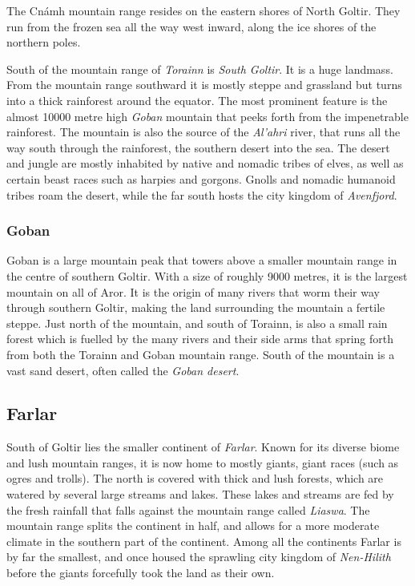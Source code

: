 The Cnámh mountain range resides on the eastern shores of North Goltir. They
run from the frozen sea all the way west inward, along the ice shores of the
northern poles.

South of the mountain range of \emph{Torainn} is \emph{South Goltir}. It is
a huge landmass. From the mountain range southward it is mostly steppe and
grassland but turns into a thick rainforest around the equator. The most
prominent feature is the almost 10000 metre high \emph{Goban} mountain that
peeks forth from the impenetrable rainforest. The mountain is also the source
of the \emph{Al'ahri} river, that runs all the way south through the
rainforest, the southern desert into the sea. The desert and jungle are mostly
inhabited by native and nomadic tribes of elves, as well as certain beast
races such as harpies and gorgons. Gnolls and nomadic humanoid tribes roam the
desert, while the far south hosts the city kingdom of \emph{Avenfjord}.

\subsubsection{Goban}
\label{sec:Goban}

Goban is a large mountain peak that towers above a smaller mountain range in
the centre of southern Goltir. With a size of roughly 9000 metres, it is the
largest mountain on all of Aror. It is the origin of many rivers that worm
their way through southern Goltir, making the land surrounding the mountain a
fertile steppe. Just north of the mountain, and south of Torainn, is also a
small rain forest which is fuelled by the many rivers and their side arms
that spring forth from both the Torainn and Goban mountain range. South of the
mountain is a vast sand desert, often called the \emph{Goban desert}.

\subsection{Farlar}
\label{sec:Farlar}

South of Goltir lies the smaller continent of \emph{Farlar}. Known for its
diverse biome and lush mountain ranges, it is now home to mostly giants, giant
races (such as ogres and trolls). The north is covered with thick and lush
forests, which are watered by several large streams and lakes. These lakes
and streams are fed by the fresh rainfall that falls against the mountain range
called \emph{Liaswa}. The mountain range splits the continent in half, and
allows for a more moderate climate in the southern part of the continent. Among
all the continents Farlar is by far the smallest, and once housed the sprawling
city kingdom of \emph{Nen-Hilith} before the giants forcefully took the land as
their own.

